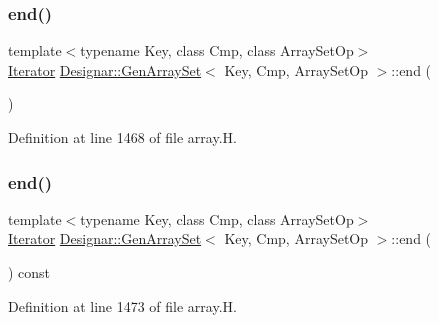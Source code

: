 \subsubsection{\texorpdfstring{end()}{end()}\hspace{0.1cm}{\footnotesize\ttfamily [1/2]}}
{\footnotesize\ttfamily template$<$typename Key, class Cmp, class Array\+Set\+Op$>$ \\
\hyperlink{class_designar_1_1_gen_array_set_1_1_iterator}{Iterator} \hyperlink{class_designar_1_1_gen_array_set}{Designar\+::\+Gen\+Array\+Set}$<$ Key, Cmp, Array\+Set\+Op $>$\+::end (\begin{DoxyParamCaption}{ }\end{DoxyParamCaption})\hspace{0.3cm}{\ttfamily [inline]}}



Definition at line 1468 of file array.\+H.

\mbox{\label{class_designar_1_1_gen_array_set_ade46fb4605ffb1e08d6475a7aacd6024}} 
\subsubsection{\texorpdfstring{end()}{end()}\hspace{0.1cm}{\footnotesize\ttfamily [2/2]}}
{\footnotesize\ttfamily template$<$typename Key, class Cmp, class Array\+Set\+Op$>$ \\
\hyperlink{class_designar_1_1_gen_array_set_1_1_iterator}{Iterator} \hyperlink{class_designar_1_1_gen_array_set}{Designar\+::\+Gen\+Array\+Set}$<$ Key, Cmp, Array\+Set\+Op $>$\+::end (\begin{DoxyParamCaption}{ }\end{DoxyParamCaption}) const\hspace{0.3cm}{\ttfamily [inline]}}



Definition at line 1473 of file array.\+H.

\mbox{\label{class_designar_1_1_gen_array_set_a2874b036273f5cc48275bd1242453930}} 

